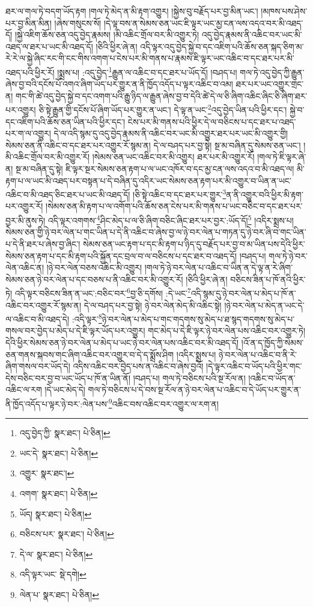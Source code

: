 ཐར་ལ་གལ་ཏེ་བདག་ཡོད་རྟག །གལ་ཏེ་མེད་ན་མི་རྟག་འགྱུར། །སྐྱེས་བུ་བརྗོད་པར་བྱ་མིན་ཡང་། །མཁས་པས་ཤེས་པར་བྱ་མིན་མིན། །ཞེས་གསུངས་སོ། །དེ་ལྟ་བས་ན་སེམས་ཅན་ཡང་ཇི་ལྟར་ཡང་མྱ་ངན་ལས་འདའ་བར་མི་འཐད་དོ། །སྐྱེ་འཇིག་ཆོས་ཅན་འདུ་བྱེད་རྣམས། །མི་འཆིང་གྲོལ་བར་མི་འགྱུར་ཏེ། འདུ་བྱེད་རྣམས་ནི་འཆིང་བར་ཡང་མི་འཐད་ལ་ཐར་པ་ཡང་མི་འཐད་དོ། །ཅིའི་ཕྱིར་ཞེ་ན། འདི་ལྟར་འདུ་བྱེད་སྐྱེ་བ་དང་འཇིག་པའི་ཆོས་ཅན་སྐད་ཅིག་མ་རེ་རེ་ལ་སྐྱེ་ཞིང་རང་གི་ངང་གིས་འགག་པ་ངེས་པར་མི་གནས་པ་རྣམས་ཇི་ལྟར་ཡང་འཆིང་བ་དང་ཐར་པར་མི་འཐད་པའི་ཕྱིར་རོ། །སྨྲས་པ། :འདུ་བྱེད་\footnote{འདུ་བྱེད་ཀྱི་  སྣར་ཐང་།  པེ་ཅིན། }རྒྱུན་ལ་འཆིང་བ་དང་ཐར་པ་ཡོད་དོ། །བཤད་པ། གལ་ཏེ་འདུ་བྱེད་ཀྱི་རྒྱུན་ཞེས་བྱ་བའི་དངོས་པོ་འགའ་ཞིག་ཡོད་པར་གྱུར་ན་ནི་ཁྱོད་འདོད་པ་ལྟར་འཆིང་བ་འམ། ཐར་པར་ཡང་འགྱུར་གྲང་ན། གང་གི་ཚེ་འདུ་བྱེད་སྐྱེ་བ་དང་འགག་པའི་རྒྱུ་ཉིད་ལ་རྒྱུན་ཞེས་བྱ་བ་དེའི་ཚེ་དེ་ལ་ཅི་ཞིག་འཆིང་ཞིང་ཅི་ཞིག་ཐར་པར་འགྱུར། ཅི་སྟེ་རྒྱུན་གྱི་དངོས་པོ་ཞིག་ཡོད་པར་གྱུར་ན་ཡང་། དེ་ལྟ་ན་ཡང་\footnote{ཡང་དེ་  སྣར་ཐང་།  པེ་ཅིན། }འདུ་བྱེད་ཡིན་པའི་ཕྱིར་དང་། སྐྱེ་བ་དང་འཇིག་པའི་ཆོས་ཅན་ཡིན་པའི་ཕྱིར་དང་། ངེས་པར་མི་གནས་པའི་ཕྱིར་དེ་ལ་བཅིངས་པ་དང་ཐར་པ་འཐད་པར་ག་ལ་འགྱུར། དེ་ལ་འདི་སྙམ་དུ་འདུ་བྱེད་རྣམས་ནི་འཆིང་བར་ཡང་མི་འགྱུར་ཐར་པར་ཡང་མི་འགྱུར་གྱི། སེམས་ཅན་ནི་འཆིང་བ་དང་ཐར་པར་འགྱུར་རོ་སྙམ་ན། དེ་ལ་བཤད་པར་བྱ་སྟེ། སྔ་མ་བཞིན་དུ་སེམས་ཅན་ཡང་། །མི་འཆིང་གྲོལ་བར་མི་འགྱུར་རོ། །སེམས་ཅན་ཡང་འཆིང་བར་མི་འགྱུར། ཐར་པར་མི་འགྱུར་རོ། །གལ་ཏེ་ཇི་ལྟར་ཞེ་ན། སྔ་མ་བཞིན་དུ་སྟེ། ཇི་ལྟར་སྔར་སེམས་ཅན་རྟག་པ་ལ་ཡང་འཁོར་བ་དང་མྱ་ངན་ལས་འདའ་བ་མི་འཐད་ལ། མི་རྟག་པ་ལ་ཡང་མི་འཐད་པར་བསྟན་པ་དེ་བཞིན་དུ་འདིར་ཡང་སེམས་ཅན་རྟག་པར་མི་འགྱུར་བ་ཡིན་ན་ཡང་འཆིང་བ་མི་འཐད་ཅིང་ཐར་པ་ཡང་མི་འཐད་དོ། །ཅི་སྟེ་འཆིང་བ་དང་ཐར་པར་གྱུར་\footnote{འགྱུར་  སྣར་ཐང་། }ན་ནི་འགྱུར་བའི་ཕྱིར་མི་རྟག་པར་འགྱུར་རོ། །སེམས་ཅན་མི་རྟག་པ་ལ་འགོག་པའི་ཆོས་ཅན་ངེས་པར་མི་གནས་པ་ཡང་བཅིང་བ་དང་ཐར་པར་བྱར་མི་ནུས་ཏེ། འདི་ལྟར་འགགས་\footnote{འགག་  སྣར་ཐང་།  པེ་ཅིན། }ཤིང་མེད་པ་ལ་ཅི་ཞིག་བཅིང་ཞིང་ཐར་པར་བྱར་:ཡོད་དོ།\footnote{ཡོད།  སྣར་ཐང་།  པེ་ཅིན། } །འདིར་སྨྲས་པ། སེམས་ཅན་གྱི་ཉེ་བར་ལེན་པ་གང་ཡིན་པ་དེ་ནི་འཆིང་བ་ཞེས་བྱ་ལ་ཉེ་བར་ལེན་པ་གཏན་དུ་ཉེ་བར་ཞི་བ་གང་ཡིན་པ་དེ་ནི་ཐར་པ་ཞེས་བྱ་ཞིང་། སེམས་ཅན་ཡང་རྟག་པ་དང་མི་རྟག་པ་ཉིད་དུ་བརྗོད་པར་བྱ་བ་མ་ཡིན་པས་དེའི་ཕྱིར་སེམས་ཅན་རྟག་པ་དང་མི་རྟག་པའི་སྐྱོན་དང་བྲལ་བ་ལ་བཅིངས་པ་དང་ཐར་བ་འཐད་དོ། །བཤད་པ། གལ་ཏེ་ཉེ་བར་ལེན་འཆིང་ན། །ཉེ་བར་ལེན་བཅས་འཆིང་མི་འགྱུར། །གལ་ཏེ་ཉེ་བར་ལེན་པ་འཆིང་བ་ཡིན་ན་དེ་ལྟ་ན་རེ་ཞིག་སེམས་ཅན་ཉེ་བར་ལེན་པ་དང་བཅས་པ་ནི་འཆིང་བར་མི་འགྱུར་རོ། །ཅིའི་ཕྱིར་ཞེ་ན། བཅིངས་ཟིན་པ་ཁོ་ནའི་ཕྱིར་ཏེ། འདི་ལྟར་བཅིངས་ཟིན་ན་ཡང་:བཅིང་བར་\footnote{བཅིངས་པར་  སྣར་ཐང་།  པེ་ཅིན། }བྱ་ཅི་དགོས། :དེ་ཡང་\footnote{དེ་ལ་  སྣར་ཐང་།  པེ་ཅིན། }འདི་སྙམ་དུ་ཉེ་བར་ལེན་པ་མེད་པ་ཁོ་ན་འཆིང་བར་འགྱུར་རོ་སྙམ་ན། དེ་ལ་བཤད་པར་བྱ་སྟེ། ཉེ་བར་ལེན་མེད་མི་འཆིང་སྟེ། །ཉེ་བར་ལེན་པ་མེད་ན་ཡང་དེ་ལ་འཆིང་བ་མི་འཐད་དེ། :འདི་ལྟར་\footnote{འདི་ལྟར་ཡང་  སྡེ་དགེ། }ཉེ་བར་ལེན་པ་མེད་པ་གང་གདགས་སུ་མེད་པ་ཐ་སྙད་གདགས་སུ་མེད་པ་གསལ་བར་བྱེད་པ་མེད་པ་དེ་ཇི་ལྟར་ཡོད་པར་འགྱུར། གང་མེད་པ་དེ་ཇི་ལྟར་ཉེ་བར་ལེན་པས་འཆིང་བར་འགྱུར་ཏེ། དེའི་ཕྱིར་སེམས་ཅན་ཉེ་བར་ལེན་པ་མེད་པ་ཡང་ཉེ་བར་ལེན་པས་འཆིང་བར་མི་འཐད་དོ། །འོ་ན་ད་ཁྱོད་ཀྱི་སེམས་ཅན་གནས་སྐབས་གང་ཞིག་འཆིང་བར་འགྱུར་བ་དེ་ད་སྨྲོས་ཤིག །འདིར་སྨྲས་པ། ཉེ་བར་ལེན་པ་འཆིང་བ་ནི་རེ་ཞིག་གསལ་བར་ཡོད་དེ། འདིས་འཆིང་བར་བྱེད་པས་ན་འཆིང་བ་ཞེས་བྱའོ། །དེ་ལྟར་འཆིང་བ་ཡོད་པའི་ཕྱིར་གང་དེས་བཅིང་བར་བྱ་བ་ཡང་ཡོད་པ་ཁོ་ན་ཡིན་ནོ། །བཤད་པ། གལ་ཏེ་བཅིངས་པའི་སྔ་རོལ་ན། །འཆིང་བ་ཡོད་ན་འཆིང་ལ་རག །དེ་ཡང་མེད་དེ། གལ་ཏེ་བཅིངས་པ་དེ་བས་སྔ་རོལ་ན་ཉེ་བར་ལེན་པ་འཆིང་བ་དེ་ཡོད་པར་གྱུར་ན་ནི་ཁྱོད་འདོད་པ་ལྟར་ཉེ་བར་:ལེན་པས་\footnote{ལེན་པ་  སྣར་ཐང་།  པེ་ཅིན། }འཆིང་བས་འཆིང་བར་འགྱུར་ལ་རག་ན། 